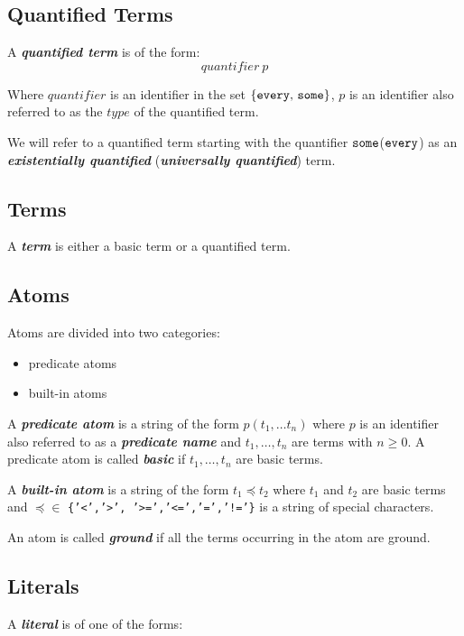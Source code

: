 \documentclass[a4paper,10pt]{article}
\begin{document}
\subsection{Quantified Terms}


A \textit{\textbf{quantified term}} is of the form:
 $$ quantifier~p $$



Where $quantifier$ is an identifier in the set $\{\mbox{\texttt{every}, \texttt{some}}\}$, $p$ is an identifier also referred to as the $type$ of the quantified term.

We will refer to a quantified term starting with the quantifier $\mbox{\texttt{some}}$($\mbox{\texttt{every}}$) as an \textbf{\textit{existentially quantified}} (\textbf{\textit{universally quantified}}) term.  


\subsection{Terms}
A \textit{\textbf{term}} is either a basic term or a quantified term.
\subsection{Atoms}

Atoms are divided into two categories:
\begin{itemize}
\item predicate atoms
\item built-in atoms
\end{itemize}

A \textit{\textbf{predicate atom}} is a string of the form $p(t_1,\ldots t_n)$ where 
$p$ is an identifier also referred to as a \textbf{\textit{predicate name}} and $t_1,\ldots,t_n$ are terms with $n \geq 0$.
A predicate atom is called \textbf{\textit{basic}} if $t_1,\ldots,t_n$ are basic terms.

A \textit{\textbf{built-in atom}} is a string of the form $t_1 \preceq t_2$ where $t_1$ and $t_2$ are basic terms and $\preceq \in$ \texttt{\{'<','>', '>=','<=','=','!='\}} is a string of special characters.

An atom is called \textbf{\textit{ground}} if all the terms occurring in the atom are ground.

\subsection{Literals}

A \textit{\textbf{literal}} is of one of the forms:
\end{document}
